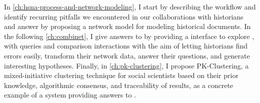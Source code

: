 In \autoref{ch:hsna-process-and-network-modeling}, I start by describing the \hsna workflow and identify recurring pitfalls we encountered in our collaborations with historians and answer \qone by proposing a network model for modeling historical documents.
In the following \autoref{ch:combinet}, I give answers to \qtwo by providing a \va interface to explore \modelplural, with queries and comparison interactions with the aim of letting historians find errors easily, transform their network data, answer their questions, and generate interesting hypotheses.
Finally, in \autoref{ch:pk-clustering}, I propose PK-Clustering, a mixed-initiative clustering technique for social scientists based on their prior knowledge, algorithmic consensus, and traceability of results, as a concrete example of a system providing answers to \qthree.




